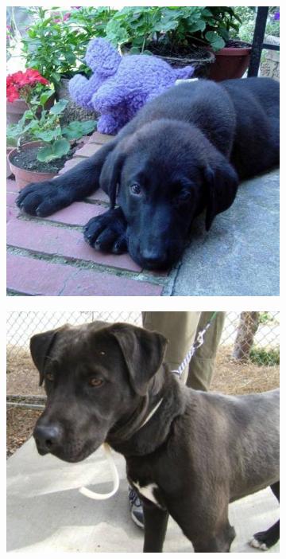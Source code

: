 \begin{figure}[h]
\begin{subfigure}[b]{.2\linewidth}
\includegraphics[width=\linewidth]{Figs/dog876.jpg}
\end{subfigure}
\begin{subfigure}[b]{.2\linewidth}
\includegraphics[width=\linewidth]{Figs/dog508.jpg}

\end{subfigure}
\end{figure}
